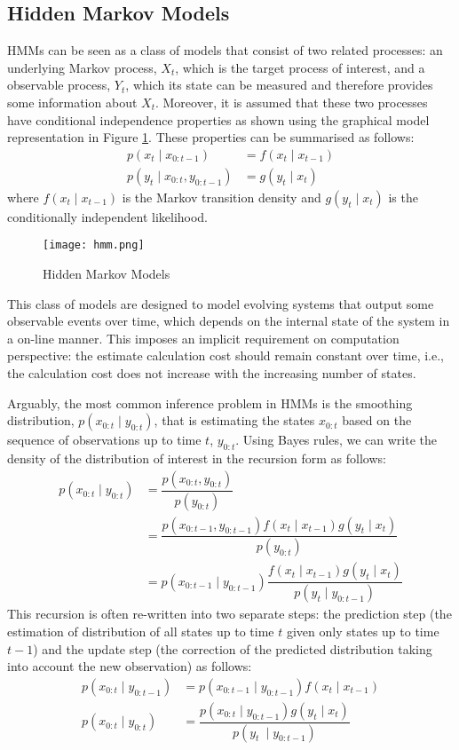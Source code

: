 \subsection{Hidden Markov Models}
HMMs can be seen as a class of models that consist of two related processes: an underlying Markov process, $X_t$, which is the target process of interest, and a observable process, $Y_t$, which its state can be measured and therefore provides some information about $X_t$. Moreover, it is assumed that these two processes have conditional independence properties as shown using the graphical model representation in Figure \ref{fig:HMM}. These properties can be summarised as follows:
\begin{align}
   p(x_t \mid x_{0:t-1}) &= f(x_t \mid x_{t-1})   \nonumber \\
   p(y_t \mid x_{0:t}, y_{0:t-1}) &= g(y_t \mid x_{t}) 
\end{align}
where $f(x_t \mid x_{t-1})$ is the Markov transition density and $g(y_t \mid x_t)$ is the conditionally independent likelihood. 

\begin{figure}[!thp]
\centering
\texttt{[image: hmm.png]} 
\caption{Hidden Markov Models}
\label{fig:HMM}
\end{figure}

This class of models are designed to model evolving systems that output some observable events over time, which depends on the internal state of the system in a on-line manner. This imposes an implicit requirement on computation perspective: the estimate calculation cost should remain constant over time, i.e., the calculation cost does not increase with the increasing number of states.

Arguably, the most common inference problem in HMMs is the smoothing distribution, $p(x_{0:t} \mid y_{0:t})$, that is estimating the states $x_{0:t}$ based on the sequence of observations up to time $t$, $y_{0:t}$. Using Bayes rules, we can write the density of the distribution of interest in the recursion form as follows:
\begin{align}
    p(x_{0:t} \mid y_{0:t}) &= \dfrac{p(x_{0:t}, y_{0:t})}{p(y_{0:t})} \nonumber \\
                            &= \dfrac{p(x_{0:t-1}, y_{0:t-1})f(x_t \mid x_{t-1}) g(y_t \mid x_t)}{p(y_{0:t})} \nonumber \\ 
                            &= p(x_{0:t-1} \mid y_{0:t-1})\dfrac{f(x_t \mid x_{t-1}) g(y_t \mid x_t)}{p(y_t \mid y_{0:t-1})} 
\end{align}
This recursion is often re-written into two separate steps: the prediction step (the estimation of distribution of all states up to time $t$ given only states up to time $t-1$) and the update step (the correction of the predicted distribution taking into account the new observation) as follows:
\begin{align}
  p(x_{0:t} \mid y_{0:t-1}) &= p(x_{0:t-1} \mid y_{0:t-1})f(x_t \mid x_{t-1}) \nonumber \\
  p(x_{0:t} \mid y_{0:t})   &= \dfrac{p(x_{0:t} \mid y_{0:t-1}) g(y_t \mid x_t)}{p(y_t\
 \mid y_{0:t-1})}
\end{align}

